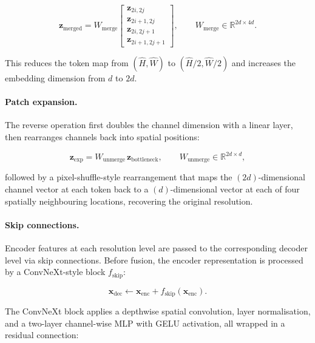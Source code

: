 \begin{equation}
    \mathbf{z}_{\text{merged}} = W_{\text{merge}} \begin{bmatrix} \mathbf{z}_{2i,2j} \\ \mathbf{z}_{2i+1,2j} \\ \mathbf{z}_{2i,2j+1} \\ \mathbf{z}_{2i+1,2j+1} \end{bmatrix},
    \qquad W_{\text{merge}} \in \mathbb{R}^{2d \times 4d}.
\end{equation}

This reduces the token map from $(\hat{H}, \hat{W})$ to $(\hat{H}/2, \hat{W}/2)$ and increases the embedding dimension from $d$ to $2d$.

\paragraph{Patch expansion.}
The reverse operation first doubles the channel dimension with a linear layer, then rearranges channels back into spatial positions:

\begin{equation}
    \mathbf{z}_{\text{exp}} = W_{\text{unmerge}} \, \mathbf{z}_{\text{bottleneck}},
    \qquad W_{\text{unmerge}} \in \mathbb{R}^{2d \times d},
\end{equation}

followed by a pixel-shuffle-style rearrangement that maps the $(2d)$-dimensional channel vector at each token back to a $(d)$-dimensional vector at each of four spatially neighbouring locations, recovering the original resolution.

\paragraph{Skip connections.}
Encoder features at each resolution level are passed to the corresponding decoder level via skip connections. Before fusion, the encoder representation is processed by a ConvNeXt-style block $f_{\text{skip}}$:

\begin{equation}
    \mathbf{x}_{\text{dec}} \leftarrow \mathbf{x}_{\text{enc}} + f_{\text{skip}}(\mathbf{x}_{\text{enc}}).
\end{equation}

The ConvNeXt block \citep{Liu2022ConvNeXt} applies a depthwise spatial convolution, layer normalisation, and a two-layer channel-wise MLP with GELU activation, all wrapped in a residual connection:


